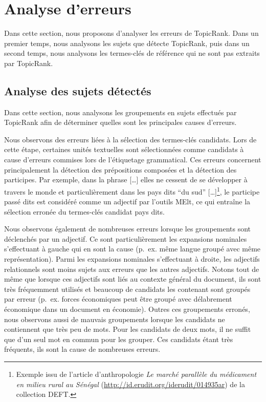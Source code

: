 \section{Analyse d'erreurs}
\label{sec:analyse_d_erreurs}
  Dans cette section, nous proposons d'analyser les erreurs de TopicRank. Dans
  un premier temps, nous analysons les sujets que détecte TopicRank, puis dans
  un second temps, nous analysons les termes-clés de référence qui ne sont pas
  extraits par Topic\-Rank.

  \subsection{Analyse des sujets détectés}
  \label{subsec:analyse_des_sujets_générés}
    Dans cette section, nous analysons les groupements en sujets effectués par
    Topic\-Rank afin de déterminer quelles sont les principales causes
    d'erreurs.

    Nous observons des erreurs liées à la sélection des
    termes-clés candidats. Lors de cette étape, certaines unités textuelles sont
    sélectionnées comme candidats à cause d'erreurs commises lors de l'étiquetage
    grammatical. Ces erreurs concernent principalement la détection des
    prépositions composées et la détection des participes. Par exemple, dans la
    phrase \og{}[\dots] elles ne cessent de se développer à travers le monde et
    particulièrement dans les pays dits ``du sud'' [\dots]\fg{}\footnote{Exemple
    issu de l'article d'anthropologie \textit{Le marché parallèle du médicament
    en milieu rural au Sénégal} (\url{http://id.erudit.org/iderudit/014935ar})
    de la collection DEFT.}, le participe passé \og{}dits\fg{} est considéré
    comme un adjectif par l'outils MElt, ce qui entraîne la sélection erronée du
    termes-clés candidat \og{}pays dits\fg{}.

    Nous observons également de nombreuses erreurs lorsque les
    groupements sont déclenchés par un adjectif. Ce sont particulièrement les
    expansions nominales s'effectuant à gauche qui en sont la cause (p.~ex.
    \og{}même langue\fg{} groupé avec \og{}même représentation\fg{}). Parmi les
    expansions nominales s'effectuant à droite, les adjectifs relationnels sont
    moins sujets aux erreurs que les autres adjectifs. Notons tout de même que
    lorsque ces adjectifs sont liés au contexte général du document, ils sont
    très fréquemment utilisés et beaucoup de candidats les contenant sont
    groupés par erreur (p.~ex. \og{}forces économiques\fg{} peut être groupé 
    avec \og{}délabrement économique\fg{} dans un document en économie). Outres
    ces groupements erronés, nous observons aussi de mauvais groupements lorsque
    les candidats ne contiennent que très peu de mots. Pour les candidats de
    deux mots, il ne suffit que d'un seul mot en commun pour les grouper. Ces
    candidats étant très fréquents, ils sont la cause de nombreuses erreurs.


